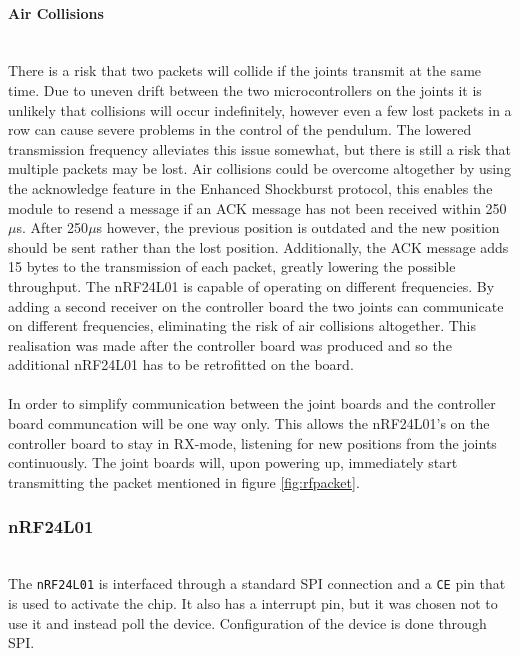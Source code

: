 \paragraph{Air Collisions}~\\ %
\label{par:air_collisions}
There is a risk that two packets will collide if the joints transmit at the same time.
Due to uneven drift between the two microcontrollers on the joints it is unlikely that collisions will occur indefinitely, however even a few lost packets in a row can cause severe problems in the control of the pendulum.
The lowered transmission frequency alleviates this issue somewhat, but there is still a risk that multiple packets may be lost.
Air collisions could be overcome altogether by using the acknowledge feature in the Enhanced Shockburst protocol, this enables the module to resend a message if an ACK message has not been received within 250$\mu$s.
After 250$\mu$s however, the previous position is outdated and the new position should be sent rather than the lost position.
Additionally, the ACK message adds 15 bytes to the transmission of each packet, greatly lowering the possible throughput.
The nRF24L01 is capable of operating on different frequencies.
By adding a second receiver on the controller board the two joints can communicate on different frequencies, eliminating the risk of air collisions altogether.
This realisation was made after the controller board was produced and so the additional nRF24L01 has to be retrofitted on the board. 
\\~\\
In order to simplify communication between the joint boards and the controller board communcation will be one way only.
This allows the nRF24L01's on the controller board to stay in RX-mode, listening for new positions from the joints continuously.
The joint boards will, upon powering up, immediately start transmitting the packet mentioned in figure \ref{fig:rfpacket}.

\subsubsection{nRF24L01} %
\label{ssubs:nrf24l01}
~\\
The \texttt{nRF24L01} is interfaced through a standard SPI connection and a \texttt{CE} pin that is used to activate the chip. 
It also has a interrupt pin, but it was chosen not to use it and instead poll the device. 
Configuration of the device is done through SPI.

